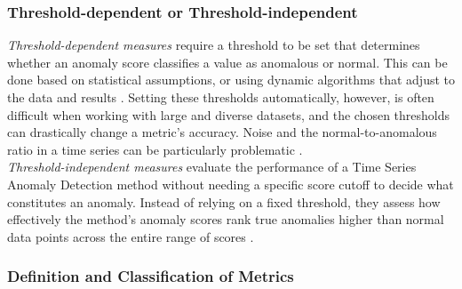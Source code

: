 \documentclass[12pt,oneside]{article}
\begin{document}
\subsubsection{Threshold-dependent or Threshold-independent}
\textit{Threshold-dependent measures} require a threshold to be set that determines whether an anomaly score classifies a value as anomalous or normal. This can be done based on statistical assumptions, or using dynamic algorithms that adjust to the data and results \parencites[p.~38-39]{boniol2024divetimeseriesanomalydetection}. Setting these thresholds automatically, however, is often difficult when working with large and diverse datasets, and the chosen thresholds can drastically change a metric's accuracy. Noise and the normal-to-anomalous ratio in a time series can be particularly problematic \parencites[p.~2777-2778]{papaVus}. \\
\textit{Threshold-independent measures} evaluate the performance of a Time Series Anomaly Detection method without needing a specific score cutoff to decide what constitutes an anomaly. Instead of relying on a fixed threshold, they assess how effectively the method's anomaly scores rank true anomalies higher than normal data points across the entire range of scores \parencites[p.~39-41]{boniol2024divetimeseriesanomalydetection}.

\subsubsection{Definition and Classification of Metrics}
\end{document}
